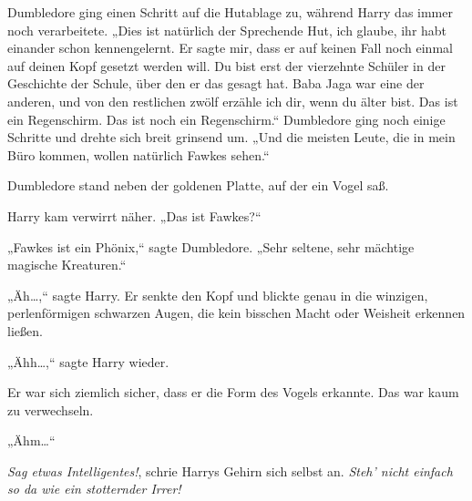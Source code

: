 Dumbledore ging einen Schritt auf die Hutablage zu, während Harry das immer noch verarbeitete. „Dies ist natürlich der Sprechende Hut, ich glaube, ihr habt einander schon kennengelernt. Er sagte mir, dass er auf keinen Fall noch einmal auf deinen Kopf gesetzt werden will. Du bist erst der vierzehnte Schüler in der Geschichte der Schule, über den er das gesagt hat. Baba Jaga war eine der anderen, und von den restlichen zwölf erzähle ich dir, wenn du älter bist. Das ist ein Regenschirm. Das ist noch ein Regenschirm.“ Dumbledore ging noch einige Schritte und drehte sich breit grinsend um. „Und die meisten Leute, die in mein Büro kommen, wollen natürlich Fawkes sehen.“

Dumbledore stand neben der goldenen Platte, auf der ein Vogel saß.

Harry kam verwirrt näher. „Das ist Fawkes?“

„Fawkes ist ein Phönix,“ sagte Dumbledore. „Sehr seltene, sehr mächtige magische Kreaturen.“

„Äh…,“ sagte Harry. Er senkte den Kopf und blickte genau in die winzigen, perlenförmigen schwarzen Augen, die kein bisschen Macht oder Weisheit erkennen ließen.

„Ähh…,“ sagte Harry wieder.

Er war sich ziemlich sicher, dass er die Form des Vogels erkannte. Das war kaum zu verwechseln.

„Ähm…“

\emph{Sag etwas Intelligentes!}, schrie Harrys Gehirn sich selbst an. \emph{Steh’ nicht einfach so da wie ein stotternder Irrer!}

